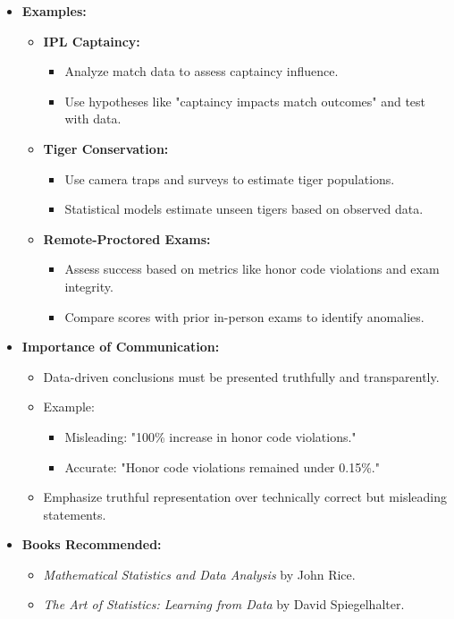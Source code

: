 \documentclass{article}
\begin{document}
\begin{itemize}
  \item \textbf{Examples:}
    \begin{itemize}
      \item \textbf{IPL Captaincy:}
        \begin{itemize}
          \item Analyze match data to assess captaincy influence.
          \item Use hypotheses like "captaincy impacts match outcomes" and test with data.
        \end{itemize}
      \item \textbf{Tiger Conservation:}
        \begin{itemize}
          \item Use camera traps and surveys to estimate tiger populations.
          \item Statistical models estimate unseen tigers based on observed data.
        \end{itemize}
      \item \textbf{Remote-Proctored Exams:}
        \begin{itemize}
          \item Assess success based on metrics like honor code violations and exam integrity.
          \item Compare scores with prior in-person exams to identify anomalies.
        \end{itemize}
    \end{itemize}

  \item \textbf{Importance of Communication:}
    \begin{itemize}
      \item Data-driven conclusions must be presented truthfully and transparently.
      \item Example:
        \begin{itemize}
          \item Misleading: "100\% increase in honor code violations."
          \item Accurate: "Honor code violations remained under 0.15\%."
        \end{itemize}
      \item Emphasize truthful representation over technically correct but misleading statements.
    \end{itemize}

  \item \textbf{Books Recommended:}
    \begin{itemize}
      \item \textit{Mathematical Statistics and Data Analysis} by John Rice.
      \item \textit{The Art of Statistics: Learning from Data} by David Spiegelhalter.
    \end{itemize}
\end{itemize}
\end{document}
